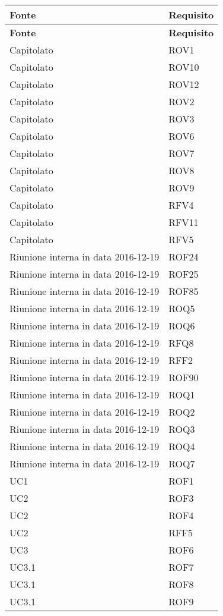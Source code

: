 \documentclass[../AnalisiDeiRequisiti_v4.0.0.tex]{subfiles}
\begin{document}
\begin{longtable}{p{4cm}!{\VRule[1pt]}p{4cm}}
\color{white} \textbf{Fonte} & \color{white} \textbf{Requisito} \\ 
\endfirsthead 
{} 
\color{white} \textbf{Fonte} & \color{white} \textbf{Requisito} \\ 
\endhead 
Capitolato & ROV1 \\
Capitolato & ROV10 \\
Capitolato & ROV12 \\
Capitolato & ROV2 \\
Capitolato & ROV3 \\
Capitolato & ROV6 \\
Capitolato & ROV7 \\
Capitolato & ROV8 \\
Capitolato & ROV9 \\
Capitolato & RFV4 \\
Capitolato & RFV11 \\
Capitolato & RFV5 \\
Riunione interna in data 2016-12-19 & ROF24 \\
Riunione interna in data 2016-12-19 & ROF25 \\
Riunione interna in data 2016-12-19 & ROF85 \\
Riunione interna in data 2016-12-19 & ROQ5 \\
Riunione interna in data 2016-12-19 & ROQ6 \\
Riunione interna in data 2016-12-19 & RFQ8 \\
Riunione interna in data 2016-12-19 & RFF2 \\
Riunione interna in data 2016-12-19 & ROF90 \\
Riunione interna in data 2016-12-19 & ROQ1 \\
Riunione interna in data 2016-12-19 & ROQ2 \\
Riunione interna in data 2016-12-19 & ROQ3 \\
Riunione interna in data 2016-12-19 & ROQ4 \\
Riunione interna in data 2016-12-19 & ROQ7 \\
UC1 & ROF1 \\
UC2 & ROF3 \\
UC2 & ROF4 \\
UC2 & RFF5 \\
UC3 & ROF6 \\
UC3.1 & ROF7 \\
UC3.1 & ROF8 \\
UC3.1 & ROF9 \\

\end{longtable}
\end{document}

